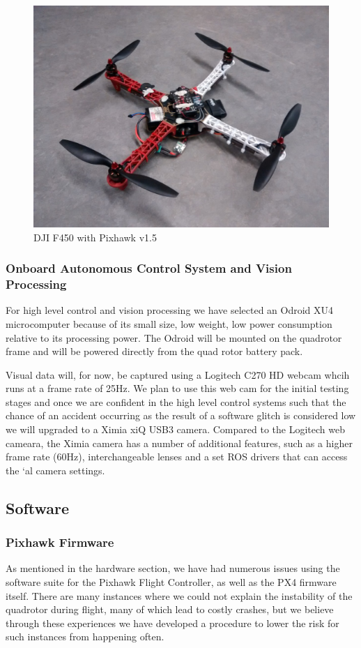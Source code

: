 \documentclass{article}[12pt]
\begin{document}
\begin{figure}[]
	\centering
	\includegraphics[width=0.6\linewidth]{images/quadrotor.jpg}
	\caption{DJI F450 with Pixhawk v1.5}
	\label{hardware}
\end{figure}

\subsubsection*{Onboard Autonomous Control System and Vision Processing}
For high level control and vision processing we have selected an Odroid XU4 microcomputer because of its small size, low weight, low power consumption relative to its processing power. The Odroid will be mounted on the quadrotor frame and will be powered directly from the quad rotor battery pack. 

Visual data will, for now,  be captured using a Logitech C270 HD webcam whcih runs at a frame rate of 25Hz. We plan to use this web cam for the initial testing stages and once we are confident in the high level control systems such that the chance of an accident occurring as the result of a software glitch is considered low we will upgraded to a Ximia xiQ USB3 camera. Compared to the Logitech web cameara, the Ximia camera has a number of additional features, such as a higher frame rate (60Hz), interchangeable lenses and a set ROS drivers that can access the `al camera settings.


\subsection*{Software}
\subsubsection*{Pixhawk Firmware}
As mentioned in the hardware section, we have had numerous issues using the software suite for the Pixhawk Flight Controller, as well as the PX4 firmware itself. There are many instances where we could not explain the instability of the quadrotor during flight, many of which lead to 
costly crashes, but we believe through these experiences we have developed a 
procedure to lower the risk for such instances from happening often.
\end{document}
